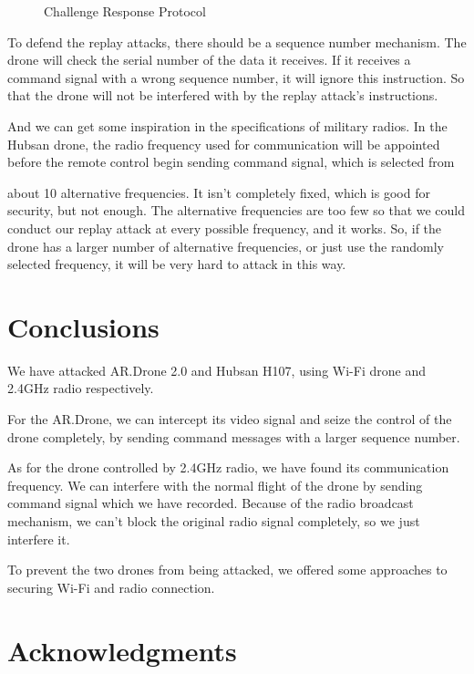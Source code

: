 \documentclass{acm_proc_article-sp}
\begin{document}
\begin{figure}
\centering
{}
\caption{Challenge Response Protocol}
\label{protocol}
\end{figure}

To defend the  replay attacks, there should be a sequence number mechanism. The drone will check the serial number of the data it receives. If it receives a command signal with a wrong sequence number, it will ignore this instruction. So that the drone will not be interfered with by the replay attack's instructions.

And we can get some inspiration in the specifications of military radios. In the Hubsan drone, the radio frequency used for communication will be appointed before the remote control begin sending command signal, which is selected from 

about 10 alternative frequencies. It isn't completely fixed, which is good for security, but not enough. The alternative frequencies are too few so that we could conduct our replay attack at every possible frequency, and it works. So, if the drone has a larger number of alternative frequencies, or just use the randomly selected frequency, it will be very hard to attack in this way.

\section{Conclusions}

We have attacked AR.Drone 2.0 and Hubsan H107, using Wi-Fi drone and 2.4GHz radio respectively. 

For the AR.Drone, we can intercept its video signal and seize the control of the drone completely, by sending command messages with a larger sequence number. 

As for the drone controlled by 2.4GHz radio, we have found its communication frequency. We can interfere with the normal flight of the drone by sending command signal which we have recorded. Because of the radio broadcast mechanism, we can't block the original radio signal completely, so we just interfere it.

To prevent the two drones from being attacked, we offered some approaches to securing Wi-Fi and radio connection.


\section{Acknowledgments}
\end{document}
